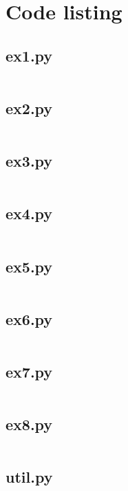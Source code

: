 \documentclass[10pt,a4paper,oneside,onecolumn]{article}
\begin{document}
\onecolumn
\appendixpage
\appendix

\section{Code listing}

\subsection{ex1.py}\label{app:ex1}
\inputminted{python}{../src/ex1.py}

\subsection{ex2.py}\label{app:ex2}
\inputminted{python}{../src/ex2.py}

\subsection{ex3.py}\label{app:ex3}
\inputminted{python}{../src/ex3.py}

\subsection{ex4.py}\label{app:ex4}
\inputminted{python}{../src/ex4.py}

\subsection{ex5.py}\label{app:ex5}
\inputminted{python}{../src/ex5.py}

\subsection{ex6.py}\label{app:ex6}
\inputminted{python}{../src/ex6.py}

\subsection{ex7.py}\label{app:ex7}
\inputminted{python}{../src/ex7.py}

\subsection{ex8.py}\label{app:ex8}
\inputminted{python}{../src/ex8.py}

\subsection{util.py}\label{app:util}
\inputminted{python}{../src/util.py}
\end{document}
